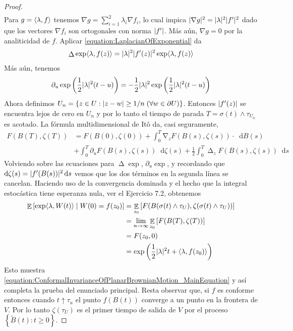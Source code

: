 \documentclass{article}
\newcommand{\ito}{Itô}
\newcommand{\brownian}{B}
\newcommand{\alteredBrownian}{\widetilde{\brownian}}
\newcommand{\wiener}{W}
\newcommand{\dd}{\mathop{}\!\mathrm{d}}
\DeclareMathOperator{\laplacian}{\Delta}
\DeclareMathOperator{\grad}{\nabla}
\DeclareMathOperator{\Expectation}{\mathbb{E}}
\DeclarePairedDelimiter{\abs}{\lvert}{\rvert}
\DeclarePairedDelimiter{\ang}{\langle}{\rangle}
\theoremstyle{plain}
\theoremstyle{remark}
\theoremstyle{definition}
\begin{document}
\begin{proof}
\begin{align}
  \end{align}
  Para \(g = \ang{\lambda , f}\) tenemos \(\nabla g = \sum_{i = 1}^2 \lambda_i \nabla f_i\), lo cual impica \(\abs{\nabla g}^2 = \abs{\lambda}^2 \abs{f'}^2\) dado que los vectores \(\nabla f_i\) son ortogonales con norma \(\abs{f'}\).
  Más aún, \(\nabla g = 0\) por la analiticidad de \(f\).
  Aplicar \ref{equation:LaplacianOfExponential} da
  \begin{align}
    \laplacian \exp \ang{\lambda, f(z)}
    =
    \abs{\lambda}^2 \abs{f'(z)}^2 \exp \ang{\lambda, f(z)}
  \end{align}
  Más aún, tenemos
  \begin{align}
    \partial_u \exp\left( \frac{1}{2} \abs{\lambda}^2 (t - u) \right)
    =
    - \frac{1}{2} \abs{\lambda}^2 \exp\left( \frac{1}{2} \abs{\lambda}^2 (t - u)\right)
  \end{align}
  Ahora definimos \(U_n = \{z \in U : \abs{z - w} \geq 1 / n \;(\forall w \in \partial U)\}\).
  Entonces \(\abs{f'(z)}\) se encuentra lejos de cero en \(U_n\) y por lo tanto el tiempo de parada \(T = \sigma(t) \wedge \tau_{U_n}\) es acotado.
  La fórmula multidimensional de \ito{} da, casi seguramente,
  \begin{align}
    F(\brownian(T), \zeta(T))
    &=
    F(\brownian(0), \zeta(0))
    + \int_0^T \grad_z F(\brownian(s), \zeta(s)) \cdot \dd \brownian(s)
    \\
    &+
    \int_0^T \partial_u F(\brownian(s), \zeta(s)) \dd \zeta(s)
    + \frac{1}{2} \int_0^T \laplacian_z F(\brownian(s), \zeta(s)) \dd s
  \end{align}
  Volviendo sobre las ecuaciones para \(\laplacian \exp\), \(\partial_u \exp\), y recordando que \(\dd \zeta(s) = \abs{f'(\brownian(s))}^2 \dd s\) vemos que los dos términos en la segunda línea se cancelan.
  Haciendo uso de la convergencia dominada y el hecho que la integral estocástica tiene esperanza nula, ver el Ejercicio 7.2, obtenemos
  \begin{align}
    \Expectation \left[
      \exp \ang{\lambda, \wiener(t)}
      \mid
      \wiener(0) = f(z_0)
    \right]
    &=
    \Expectation_{z_0} \left[ F(\brownian(\sigma(t) \wedge \tau_U), \zeta(\sigma(t) \wedge \tau_U))\right]
    \\
    &=
    \lim_{n \rightarrow \infty} \Expectation_{z_0} \left[F(\brownian(T), \zeta(T))\right]
    \\
    &=
    F(z_0, 0)
    \\
    &=
    \exp \left( \frac{1}{2} \abs{\lambda}^2 t + \ang{\lambda, f(z_0)} \right)
  \end{align}
  Esto muestra \eqref{equation:ConformalInvarianceOfPlanarBrownianMotion_MainEquation} y así completa la prueba del enunciado principal.
  Resta observar que, si \(f\) es conforme entonces cuando \(t \uparrow \tau_u\) el punto \(f(\brownian(t))\) converge a un punto en la frontera de \(V\).
  Por lo tanto \(\zeta(\tau_U)\) es el primer tiempo de salida de \(V\) por el proceso \(\left\{ \alteredBrownian(t) : t \geq 0 \right\}\).
\end{proof}
\end{document}

